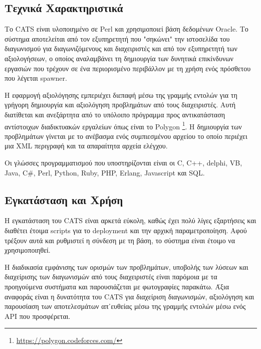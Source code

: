 \documentclass[diploma]{softlab-thesis}
\begin{document}
\subsection{Τεχνικά Χαρακτηριστικά}

Το CATS είναι υλοποιημένο σε Perl και χρησιμοποιεί βάση δεδομένων Oracle. Το
σύστημα αποτελείται από τον εξυπηρετητή που "σηκώνει" την ιστοσελίδα του
διαγωνισμού για διαγωνιζόμενους και διαχειριστές και από τον εξυπηρετητή των
αξιολογήσεων, ο οποίος αναλαμβάνει τη δημιουργία των δυνητικά επικίνδυνων
εργασιών που τρέχουν σε ένα περιορισμένο περιβάλλον με τη χρήση ενός πρόσθετου
που λέγεται spawner.

\bigskip

Η εφαρμογή αξιολόγησης εμπεριέχει διεπαφή μέσω της γραμμής εντολών για τη
γρήγορη δημιουργία και αξιολόγηση προβλημάτων από τους διαχειριστές. Αυτή
διατίθεται και ανεξάρτητα από το υπόλοιπο πρόγραμμα προς αντικατάσταση
αντίστοιχων διαδικτυακών εργαλείων όπως είναι το Polygon
\footnote{\url{https://polygon.codeforces.com/}}. Η δημιουργία των προβλημάτων
γίνεται με το ανέβασμα ενός συμπιεσμένου αρχείου το οποίο περιέχει μια XML
περιγραφή και τα απαραίτητα αρχεία ελέγχου.



\bigskip

Οι γλώσσες προγραμματισμού που υποστηρίζονται είναι οι C, C++, delphi, VB, Java,
C\#, Perl, Python, Ruby, PHP, Erlang, Javascript και SQL.

\subsection{Εγκατάσταση και Χρήση}

Η εγκατάσταση του CATS είναι αρκετά εύκολη, καθώς έχει πολύ λίγες εξαρτήσεις
και διαθέτει έτοιμα scripts για το deployment και την αρχική παραμετροποίηση.
Αφού τρέξουν αυτά και ρυθμιστεί η σύνδεση με τη βάση, το σύστημα είναι έτοιμο
να χρησιμοποιηθεί.

\bigskip

Η διαδικασία εμφάνισης των ορισμών των προβλημάτων, υποβολής των λύσεων και
διαχείρισης των διαγωνισμών από τους διαχειριστές είναι παρόμοια με τα προηγούμενα
συστήματα και παρουσιάζεται με φωτογραφίες παρακάτω. Άξια αναφοράς είναι
η δυνατότητα του CATS για διαχείριση διαγωνισμών, αξιολόγηση και παρουσίαση των
αποτελεσμάτων απ᾽ευθείας μέσω της γραμμής εντολών μέσω ενός API που προσφέρεται.
\end{document}

